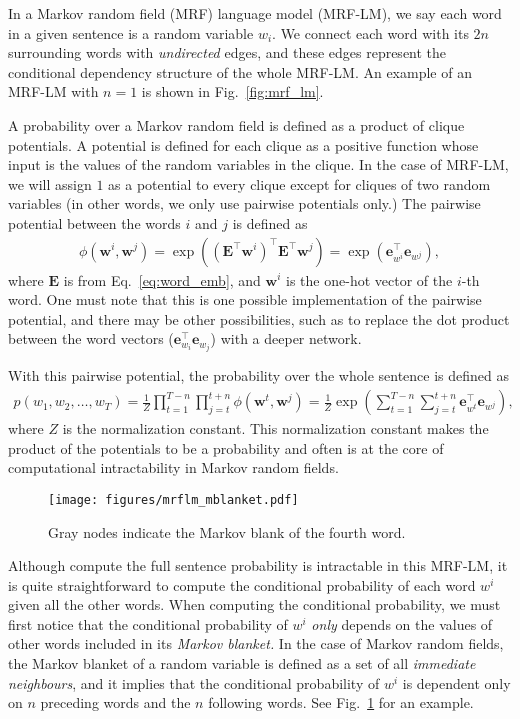 \documentclass{report}
\newcommand{\vect}[1]{\mathbf{#1}}
\newcommand{\matr}[1]{\mathbf{#1}}
\newcommand{\ve}[0]{\vect{e}}
\newcommand{\vw}[0]{\vect{w}}
\newcommand{\mE}[0]{\matr{E}}
\begin{document}
In a Markov random field (MRF) language model (MRF-LM), we say each word in a
given sentence is a random variable $w_i$. We connect each word with its $2n$
surrounding words with {\em undirected} edges, and these edges represent the
conditional dependency structure of the whole MRF-LM. An example of an MRF-LM
with $n=1$ is shown in Fig.~\ref{fig:mrf_lm}.

A probability over a Markov random field is defined as a product of clique
potentials. A potential is defined for each clique as a positive function whose
input is the values of the random variables in the clique. In the case of
MRF-LM, we will assign $1$ as a potential to every clique except for cliques of
two random variables (in other words, we only use pairwise potentials only.) The
pairwise potential between the words $i$ and $j$ is defined as
\begin{align*}
    \phi(\vw^i, \vw^j) = \exp\left( (\mE^\top \vw^{i})^\top  \mE^\top \vw^j\right) = 
    \exp\left( \ve_{w^i}^\top \ve_{w^j} \right),
\end{align*}
where $\mE$ is from Eq.~\eqref{eq:word_emb}, and $\vw^i$ is the one-hot
vector of the $i$-th word. One must note that this is one possible
implementation of the pairwise potential, and there may be other possibilities,
such as to replace the dot product between the word vectors ($\ve_{w_i}^\top
\ve_{w_j}$) with a deeper network.

With this pairwise potential, the probability over the whole sentence is defined
as
\begin{align*}
    p(w_1, w_2, \ldots, w_T) = \frac{1}{Z} \prod_{t=1}^{T-n} \prod_{j=t}^{t+n}
    \phi(\vw^t, \vw^j) = \frac{1}{Z} \exp\left( 
        \sum_{t=1}^{T-n} \sum_{j=t}^{t+n} \ve_{w^t}^\top \ve_{w^j}
    \right),
\end{align*}
where $Z$ is the normalization constant. This normalization constant makes the
product of the potentials to be a probability and often is at the core of
computational intractability in Markov random fields.

\begin{figure}[ht]
    \centering
    \texttt{[image: figures/mrflm\_mblanket.pdf]}
    \caption{Gray nodes indicate the Markov blank of the fourth word.}
    \label{fig:mrf_lm_mblanket}
\end{figure}

Although compute the full sentence probability is intractable in this MRF-LM, it
is quite straightforward to compute the conditional probability of each word
$w^i$ given all the other words. When computing the conditional probability, we
must first notice that the conditional probability of $w^i$ {\em only} depends
on the values of other words included in its {\em Markov blanket.} In the case
of Markov random fields, the Markov blanket of a random variable is defined as a
set of all {\em immediate neighbours}, and it implies that the conditional
probability of $w^i$ is dependent only on $n$ preceding words and the $n$
following words. See Fig.~\ref{fig:mrf_lm_mblanket} for an example.
\end{document}
